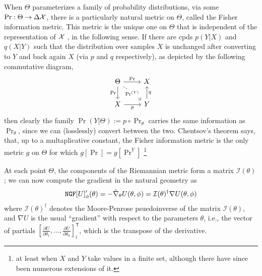 \documentclass{article}
\begin{document}
When $\Theta$ parameterizes a family of probability distributions, via some $\Pr : \Theta \to \Delta \mathcal X$, there is a particularly natural metric on $\Theta$, called the Fisher information metric.
This metric is the unique one on $\Theta$ that is
independent of the representation of $\mathcal X$ \parencite{chentsov}, in the following sense.
If there are cpds $p(Y|X)$ and $q(X|Y)$ such that
the distribution over samples $X$ is unchanged after converting to $Y$ and back again $X$ (via $p$ and $q$ respectively), as depicted by the following commutative diagram,
\[
    \begin{tikzcd}
        \Theta \ar[r,"\Pr"]\ar[d,"\Pr"']
            \ar[rd,dashed,"\Pr^{(Y)}"description]& X \\
        X \ar[r,"p"'] & Y \ar[u, "q"']
    \end{tikzcd}
\]
then clearly the family $\Pr(Y|\Theta) := p\circ\Pr_{\theta}$ carries the same information as $\Pr_\theta$, since we can (losslessly) convert between the two.
Chentsov's theorem says, that, up to a multaplicative constant, the Fisher information metric is the only metric $g$ on $\Theta$ for which
$g[\Pr] = g[\Pr^{Y}]$
\footnote{at least when $X$ and $Y$ take values in a finite set, although there have since been numerous extensions of it.}


At each point $\Theta$, the components of the Riemannian metric form a matrix $\mathcal I(\theta)$; we can now compute the gradient in the natural geometry as
\[
    \mathtt{NGF}[U]'_\phi (\theta) = - \hat \nabla_\theta U(\theta,\phi)
        = \mathcal I(\theta)^{\dagger}  \nabla U(\theta, \phi)
\]
where $ \mathcal I(\theta)^{\dagger} $ denotes the Moore-Penrose psuedoinverse of the matrix $ \mathcal I(\theta)$,
and $\nabla U$ is the usual ``gradient'' with respect to the parameters $\theta$, i.e., the vector of partials
$[\frac{\partial U}{\partial \theta_1}, %
 \ldots, \frac{\partial U}{\partial \theta_n}]_{i}^{\mathsf T}$,
which is the transpose of the derivative.
\end{document}
